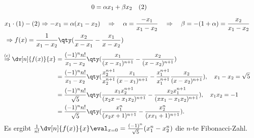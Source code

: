 \begin{enumerate}[label=(\alph*)]
\begin{align}
            &\hspace{4.4cm}\quad 0 = \alpha x_1 + \beta x_2 \quad (2)\\[2mm]
            &x_1\cdot(1)-(2) \Rightarrow -x_1 = \alpha (x_1 - x_2)  \quad \Rightarrow \quad \alpha = \frac{-x_1}{x_1-x_2} \quad \Rightarrow\quad \beta = -(1+\alpha) = \frac{x_2}{x_1-x_2} \\
            &\Rightarrow f(x) = \frac{1}{x_1-x_2}\qty(\frac{x_2}{x-x_1}- \frac{ x_1}{x-x_2})
        \end{align}
        \begin{align}
            \overset{(e)}{\Rightarrow} \dv[n]{f(x)}{x} &= \frac{(-1)^n n!}{x_1-x_2} \qty(\frac{x_1}{(x-x_1)^{n+1}} - \frac{x_2}{(x-x_2)^{n+1}}) \\
            &= \frac{(-1)^n n!}{x_1-x_2} \qty(\frac{x_2^{n+1}}{x_2^{n+1}} \frac{x_1}{(x-x_1)^{n+1}} - \frac{x_1^{n+1}}{x_1^{n+1}} \frac{x_2}{(x-x_2)^{n+1}}), \quad x_1-x_2 =  \sqrt{5}\\
            &= \frac{(-1)^n n!}{\sqrt{5}} \qty( \frac{x_1 x_2^{n+1}}{(x_2x-x_1x_2)^{n+1}} -  \frac{x_2 x_1^{n+1}}{(xx_1-x_1x_2)^{n+1}}), \quad x_1 x_2 = -1 \\
            &= \frac{(-1)^n n!}{\sqrt{5}} \qty( \frac{x_1^n}{(x_2x+1)^{n+1}} -  \frac{x_2^n}{(xx_1+1)^{n+1}}).
        \end{align}
        Es ergibt $\frac{1}{n!} \dv[n]{f(x)}{x}\eval_{x=0} = \frac{(-1)^n}{\sqrt{5}}(x_1^n -x_2^n)$ die $n$-te Fibonacci-Zahl.
    \end{enumerate}
%
\newpage
